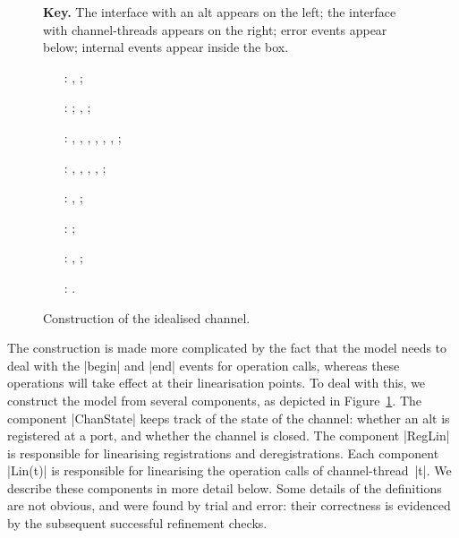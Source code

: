 \begin{figure}

\uncspMid
\textbf{Key.} 
The interface with an alt appears on the left; the
interface with channel-threads appears on the right; error events appear
below; internal events appear inside the box. 

\raggedright
%
\begin{itemize}
\item[\inCircle{1}:]  \m{}\m{}, 
  \m{}\m{};

\item[\inCircle{2}:] \m{};
  \m{}, ;

\item[\inCircle{3}:] , ,
  , , , ,
  ;

\item[\inCircle{4}:] \m{},
  \m{}, \m{},
  \m{}, \m{};

\item[\inCircle{5}:] \m{},
  \m{};

\item[\inCircle{6}:] \m{};

\item[\inCircle{7}:] ,
  \m{};

\item[\inCircle{8}:] \m{}.
\end{itemize}
\caption{Construction of the idealised channel.  \label{fig:idealised-chan}}
\end{figure}

\cspMid


The construction is made more complicated by the fact that the model needs to
deal with the |begin| and |end| events for operation calls, whereas these
operations will take effect at their linearisation points.  To deal with this,
we construct the model from several components, as depicted in
Figure~\ref{fig:idealised-chan}.  The component |ChanState| keeps track of the
state of the channel: whether an alt is registered at a port, and whether the
channel is closed.  The component |RegLin| is responsible for linearising
registrations and deregistrations.  Each component |Lin(t)| is responsible for
linearising the operation calls of channel-thread~|t|.  We describe these
components in more detail below.  Some details of the definitions are not
obvious, and were found by trial and error: their correctness is evidenced by
the subsequent successful refinement checks.

